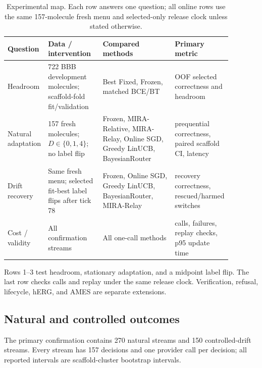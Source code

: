 \documentclass[sigconf,anonymous]{aamas}
\begin{document}
\begin{table}[t]
\caption{Experimental map. Each row answers one question; all online rows use the same 157-molecule fresh menu and selected-only release clock unless stated otherwise.}
\label{tab:matrix}
\footnotesize
{\setlength{\tabcolsep}{2pt}
\begin{tabular}{@{}P{0.15\linewidth}P{0.25\linewidth}P{0.34\linewidth}P{0.14\linewidth}@{}}
\toprule
Question & Data / intervention & Compared methods & Primary metric \\
\midrule
Headroom & 722 BBB development molecules; scaffold-fold fit/validation & Best Fixed, Frozen, matched BCE/BT & OOF selected correctness and headroom \\
Natural adaptation & 157 fresh molecules; $D\in\{0,1,4\}$; no label flip & Frozen, MIRA-Relative, MIRA-Relay, Online SGD, Greedy LinUCB, BayesianRouter & prequential correctness, paired scaffold CI, latency \\
Drift recovery & Same fresh menu; selected fit-best label flips after tick 78 & Frozen, Online SGD, Greedy LinUCB, BayesianRouter, MIRA-Relay & recovery correctness, rescued/harmed switches \\
Cost / validity & All confirmation streams & All one-call methods & calls, failures, replay checks, p95 update time \\
\bottomrule
\end{tabular}}
\end{table}

Rows 1--3 test headroom, stationary adaptation, and a midpoint label flip. The last row checks calls and replay under the same release clock. Verification, refusal, lifecycle, hERG, and AMES are separate extensions.

\subsection{Natural and controlled outcomes}
The primary confirmation contains 270 natural streams and 150 controlled-drift streams. Every stream has 157 decisions and one provider call per decision; all reported intervals are scaffold-cluster bootstrap intervals.
\end{document}
